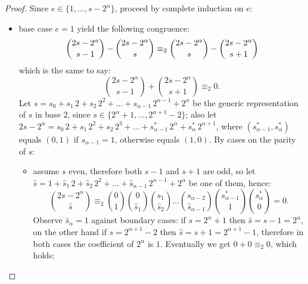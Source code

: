 \begin{proof}
Since $e\in\lbrace1,\ldots,s-2^{{\alpha}}\rbrace$, proceed by complete induction on $e$:
\begin{itemize}
    \item base case $e=1$ yield the following congruence:
        \begin{displaymath}
                {{2s-2^{{\alpha}}}\choose{s-1}}-{{2s-2^{{\alpha}}}\choose{s}}
                \equiv_{2}
                {{2s-2^{{\alpha}}}\choose{s}}-{{2s-2^{{\alpha}}}\choose{s+1}}\\
        \end{displaymath}
        which is the same to say:
        \begin{displaymath}
                {{2s-2^{{\alpha}}}\choose{s-1}}+{{2s-2^{{\alpha}}}\choose{s+1}} \equiv_{2} 0.
        \end{displaymath}
        Let $s=s_{0}+s_{1}\,2+s_{2}\,2^{2}+\ldots+s_{{\alpha}-1}\,2^{{\alpha}-1} + 2^{{\alpha}}$
        be the generic representation of $s$ in base $2$, since 
        $s\in\lbrace 2^{{\alpha}}+1,\ldots,2^{{\alpha}+1}-2 \rbrace$; also  
        let $2s-2^{{\alpha}}=s_{0}\,2+s_{1}\,2^{2}+s_{2}\,2^{3}+\ldots+s_{{\alpha}-1}^{*}\,2^{{\alpha}} + s_{{\alpha}}^{*}\,2^{{\alpha}+1}$,
        where $(s_{{\alpha}-1}^{*},s_{{\alpha}}^{*})$ equals $(0,1)$ if $s_{{\alpha}-1}=1$, otherwise equals $(1,0)$.
        By cases on the parity of $s$:
        \begin{itemize}
            \item assume $s$ even, therefore both $s-1$ and $s+1$ are odd, so 
                let $\hat{s}=1+\hat{s}_{1}\,2+\hat{s}_{2}\,2^{2}+\ldots+
                    \hat{s}_{{\alpha}-1}\,2^{{\alpha}-1}+2^{{\alpha}}$ be one of them, hence:
                \begin{displaymath}
                        {{2s-2^{{\alpha}}}\choose{\hat{s}}}  
                        \equiv_{2}
                        {{0}\choose{1}} 
                        {{0}\choose{\hat{s}_{1}}}
                        {{s_{1}}\choose{\hat{s}_{2}}}
                        \ldots
                        {{s_{{\alpha}-2}}\choose{\hat{s}_{{\alpha}-1}}}
                        {{s_{{\alpha}-1}^{*}}\choose{1}}
                        {{s_{{\alpha}}^{*}}\choose{0}} = 0.
                \end{displaymath}
                Observe $\hat{s}_{{\alpha}}=1$ against boundary cases:
                if $s=2^{{\alpha}}+1$ then $\hat{s}=s-1=2^{{\alpha}}$, on the other
                hand if $s=2^{{\alpha}+1}-2$ then $\hat{s}=s+1=2^{{\alpha}+1}-1$,
                therefore in both cases the coefficient of $2^{{\alpha}}$ is $1$.
                Eventually we get $0+0 \equiv_{2}0$, which holds;


\end{itemize}
\end{itemize}
\end{proof}
